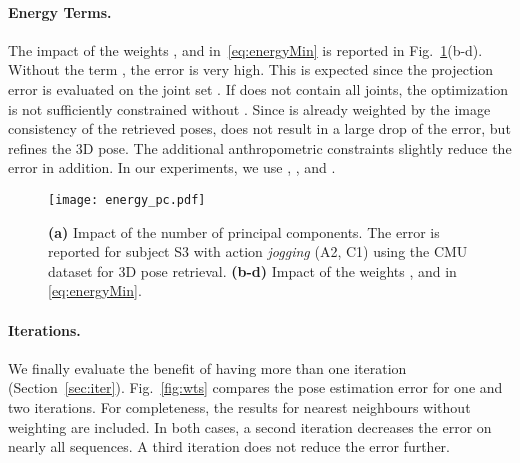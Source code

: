 \documentclass[10pt,twocolumn,letterpaper]{article}
\begin{document}
\paragraph{Energy Terms.}
The impact of the weights ,  and  in~\eqref{eq:energyMin} is reported in Fig.~\ref{fig:energy_pc}(b-d). Without the term , the error is very high. This is expected since the projection error  is evaluated on the joint set . If  does not contain all joints, the optimization is not sufficiently constrained without . Since  is already weighted by the image consistency of the retrieved poses,  does not result in a large drop of the error, but refines the 3D pose. The additional anthropometric constraints  slightly reduce the error in addition. In our experiments, we use , , and .
\begin{figure}[t]
\begin{center}
\texttt{[image: energy\_pc.pdf]}
\end{center}
   \vspace{-5mm}	
   \caption{\textbf{(a)} Impact of the number of principal components. The error is reported for subject S3 with action \textit{jogging} (A2, C1) using the CMU dataset for 3D pose retrieval.  \textbf{(b-d)} Impact of the weights ,  and  in \eqref{eq:energyMin}.
 }
\label{fig:energy_pc}
\end{figure}

\vspace{-3.5mm}
\paragraph{Iterations.}
We finally evaluate the benefit of having more than one iteration (Section~\ref{sec:iter}). Fig.~\ref{fig:wts} compares the pose estimation error for one and two iterations. For completeness, the results for nearest neighbours without weighting are included. In both cases, a second iteration decreases the error on nearly all sequences. A third iteration does not reduce the error further.
\end{document}
